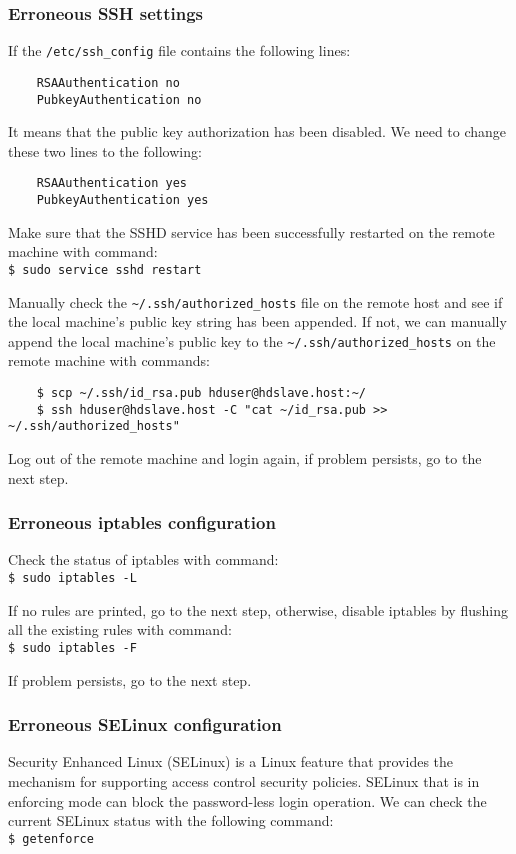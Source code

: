 \subsubsection*{Erroneous SSH settings}
If the \verb|/etc/ssh_config| file contains the following lines:
\begin{verbatim}
    RSAAuthentication no
    PubkeyAuthentication no
\end{verbatim}

It means that the public key authorization has been disabled. We need to change these two lines to the following:
\begin{verbatim}
    RSAAuthentication yes
    PubkeyAuthentication yes
\end{verbatim}

Make sure that the SSHD service has been successfully restarted on the remote machine with command: \\
\verb|$ sudo service sshd restart|

Manually check the \verb|~/.ssh/authorized_hosts| file on the remote host and see if the local machine's public key string has been appended. If not, we can manually append the local machine's public key to the \verb|~/.ssh/authorized_hosts| on the remote machine with commands:
\begin{verbatim}
    $ scp ~/.ssh/id_rsa.pub hduser@hdslave.host:~/
    $ ssh hduser@hdslave.host -C "cat ~/id_rsa.pub >> ~/.ssh/authorized_hosts"
\end{verbatim}

Log out of the remote machine and login again, if problem persists, go to the next step.
\subsubsection*{Erroneous iptables configuration}
Check the status of iptables with command: \\
\verb|$ sudo iptables -L|

If no rules are printed, go to the next step, otherwise, disable iptables by flushing all the existing rules with command: \\
\verb|$ sudo iptables -F|

If problem persists, go to the next step.
\subsubsection*{Erroneous SELinux configuration}
Security Enhanced Linux (SELinux) is a Linux feature that provides the mechanism for supporting access control security policies. SELinux that is in enforcing mode can block the password-less login operation. We can check the current SELinux status with the following command: \\
\verb|$ getenforce|

